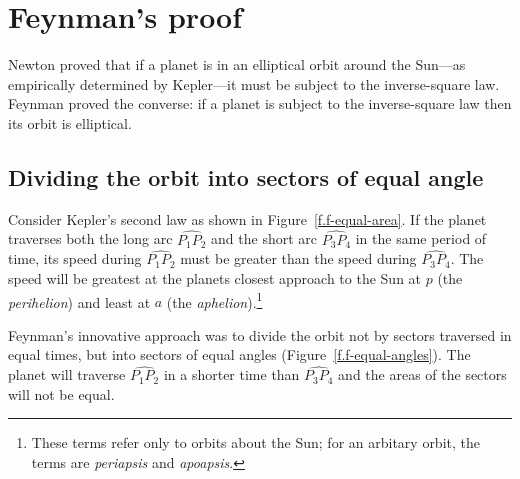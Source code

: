 

\chapter{Feynman's proof}\label{s.feynman}


Newton proved that if a planet is in an elliptical orbit around the Sun---as empirically determined by Kepler---it must be subject to the inverse-square law. Feynman proved the converse: if a planet is subject to the inverse-square law then its orbit is elliptical. 

\section{Dividing the orbit into sectors of equal angle}

Consider Kepler's second law as shown in Figure~\ref{f.f-equal-area}. If the planet traverses both the long arc $\widehat{P_1P_2}$ and the short arc $\widehat{P_3P_4}$ in the same period of time, its speed during $\widehat{P_1P_2}$ must be greater than the speed during $\widehat{P_3P_4}$. The speed will be greatest at the planets closest approach to the Sun at $p$ (the \emph{perihelion}) and least at $a$ (the \emph{aphelion}).\footnote{These terms refer only to orbits about the Sun; for an arbitary orbit, the terms are \emph{periapsis} and \emph{apoapsis}.}

Feynman's innovative approach was to divide the orbit not by sectors traversed in equal times, but into sectors of equal angles (Figure~\ref{f.f-equal-angles}). The planet will traverse $\widehat{P_1P_2}$ in a shorter time than $\widehat{P_3P_4}$ and the areas of the sectors will not be equal.


